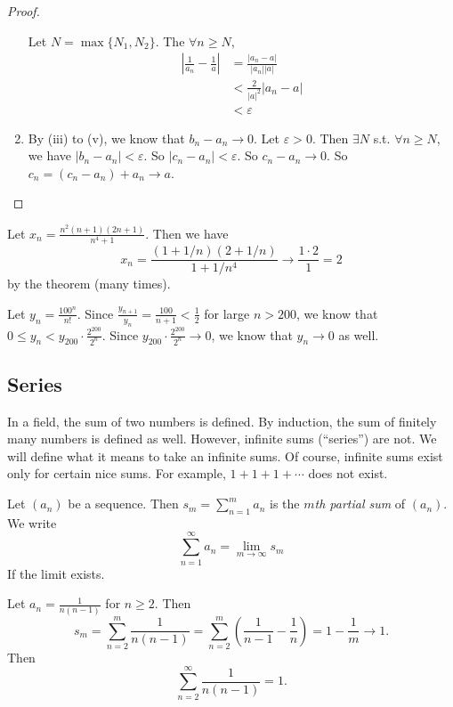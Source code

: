 \documentclass[a4paper]{article}
\begin{document}
\begin{proof}
\begin{enumerate}
      Let $N = \max\{N_1, N_2\}$. The $\forall n \geq N$,
      \begin{align*}
        \left|\frac{1}{a_n} - \frac{1}{a}\right| &= \frac{|a_n - a|}{|a_n||a|}\\
        &< \frac{2}{|a|^2}|a_n - a|\\
        &< \varepsilon
      \end{align*}
    \item By (iii) to (v), we know that $b_n - a_n \to 0$. Let $\varepsilon > 0$. Then $\exists N$ s.t. $\forall n\geq N$, we have $|b_n - a_n| < \varepsilon$. So $|c_n - a_n| < \varepsilon$. So $c_n - a_n \to 0$. So $c_n = (c_n - a_n) + a_n \to a$.
  \end{enumerate}
\end{proof}

\begin{eg}
  Let $x_n = \frac{n^2(n + 1)(2n + 1)}{n^4 + 1}$. Then we have
  \[
    x_n = \frac{(1 + 1/n)(2 + 1/n)}{1 + 1/n^4}\to \frac{1\cdot 2}{1} = 2
  \]
  by the theorem (many times).
\end{eg}

\begin{eg}
  Let $y_n = \frac{100^n}{n!}$. Since $\frac{y_{n + 1}}{y_n} = \frac{100}{n + 1} < \frac{1}{2}$ for large $n > 200$, we know that $0 \leq y_n < y_{200}\cdot \frac{2^{200}}{2^n}$. Since $y_{200}\cdot \frac{2^{200}}{2^n} \to 0$, we know that $y_n\to 0$ as well.
\end{eg}

\subsection{Series}
In a field, the sum of two numbers is defined. By induction, the sum of finitely many numbers is defined as well. However, infinite sums (``series'') are not. We will define what it means to take an infinite sums. Of course, infinite sums exist only for certain nice sums. For example, $1 + 1 + 1 + \cdots$ does not exist.

\begin{defi}
  Let $(a_n)$ be a sequence. Then $s_m = \sum_{n = 1}^m a_n$ is the \emph{$m$th partial sum} of $(a_n)$. We write
  \[
    \sum_{n = 1}^\infty a_n = \lim_{m\to \infty} s_m
  \]
  If the limit exists.
\end{defi}

\begin{eg}
  Let $a_n = \frac{1}{n(n - 1)}$ for $n\geq 2$. Then
  \[
    s_m = \sum_{n = 2}^m \frac{1}{n(n - 1)} = \sum_{n = 2}^m\left(\frac{1}{n - 1} - \frac{1}{n}\right) = 1 - \frac{1}{m}\to 1.
  \]
  Then
  \[
    \sum_{n = 2}^\infty \frac{1}{n(n - 1)} = 1.
  \]
\end{eg}
\end{document}
